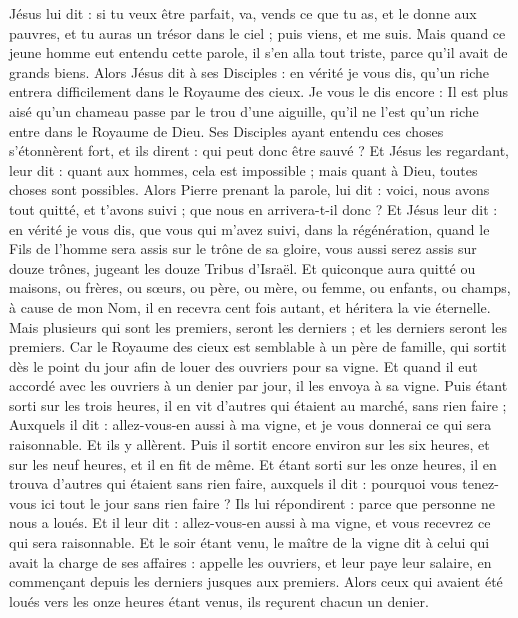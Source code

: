 \begin{multicols}{2}
Jésus lui dit : si tu veux être parfait, va, vends ce que tu as, et le donne aux pauvres, et tu auras un trésor dans le ciel ; puis viens, et me suis.
Mais quand ce jeune homme eut entendu cette parole, il s'en alla tout triste, parce qu'il avait de grands biens.
Alors Jésus dit à ses Disciples : en vérité je vous dis, qu'un riche entrera difficilement dans le Royaume des cieux.
Je vous le dis encore : Il est plus aisé qu'un chameau passe par le trou d'une aiguille, qu'il ne l'est qu'un riche entre dans le Royaume de Dieu.
Ses Disciples ayant entendu ces choses s'étonnèrent fort, et ils dirent : qui peut donc être sauvé ?
Et Jésus les regardant, leur dit : quant aux hommes, cela est impossible ; mais quant à Dieu, toutes choses sont possibles.
Alors Pierre prenant la parole, lui dit : voici, nous avons tout quitté, et t'avons suivi ; que nous en arrivera-t-il donc ?
Et Jésus leur dit : en vérité je vous dis, que vous qui m'avez suivi, dans la régénération, quand le Fils de l'homme sera assis sur le trône de sa gloire, vous aussi serez assis sur douze trônes, jugeant les douze Tribus d'Israël.
Et quiconque aura quitté ou maisons, ou frères, ou sœurs, ou père, ou mère, ou femme, ou enfants, ou champs, à cause de mon Nom, il en recevra cent fois autant, et héritera la vie éternelle.
Mais plusieurs qui sont les premiers, seront les derniers ; et les derniers seront les premiers.
\VerseOne{}Car le Royaume des cieux est semblable à un père de famille, qui sortit dès le point du jour afin de louer des ouvriers pour sa vigne.
Et quand il eut accordé avec les ouvriers à un denier par jour, il les envoya à sa vigne.
Puis étant sorti sur les trois heures, il en vit d'autres qui étaient au marché, sans rien faire ;
Auxquels il dit : allez-vous-en aussi à ma vigne, et je vous donnerai ce qui sera raisonnable.
Et ils y allèrent. Puis il sortit encore environ sur les six heures, et sur les neuf heures, et il en fit de même.
Et étant sorti sur les onze heures, il en trouva d'autres qui étaient sans rien faire, auxquels il dit : pourquoi vous tenez-vous ici tout le jour sans rien faire ?
Ils lui répondirent : parce que personne ne nous a loués. Et il leur dit : allez-vous-en aussi à ma vigne, et vous recevrez ce qui sera raisonnable.
Et le soir étant venu, le maître de la vigne dit à celui qui avait la charge de ses affaires : appelle les ouvriers, et leur paye leur salaire, en commençant depuis les derniers jusques aux premiers.
Alors ceux qui avaient été loués vers les onze heures étant venus, ils reçurent chacun un denier.

\end{multicols}
